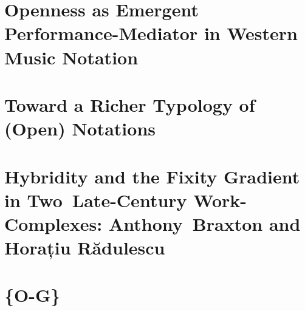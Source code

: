 \documentclass[12pt,fleqn,hyphens]{ucithesis}
\begin{document}
\preliminarypages


\setlength{\parskip}{0pt}
\setlength{\parindent}{15pt}

\chapter{Openness as Emergent Performance-Mediator in Western Music Notation}


\chapter{Toward a Richer Typology of (Open) Notations}


\chapter{Hybridity and the Fixity Gradient in Two~Late-Century Work-Complexes: Anthony~Braxton and Horațiu Rădulescu}


\chapter{\{O-G\}}


\newpage
{} %
\begingroup
{}
\setlength\bibitemsep{6.5pt} %

\nocite{*}
\printbibliography

\endgroup

\clearpage
{}






\begin{appendices}

\end{appendices}
\end{document}
